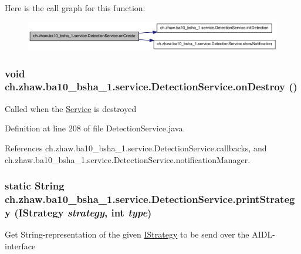 Here is the call graph for this function:\nopagebreak
\begin{figure}[H]
\begin{center}
\leavevmode
\includegraphics[width=324pt]{classch_1_1zhaw_1_1ba10__bsha__1_1_1service_1_1DetectionService_a78b14ab8beb6bafa58ed1eb4c601d8a6_cgraph}
\end{center}
\end{figure}
\hypertarget{classch_1_1zhaw_1_1ba10__bsha__1_1_1service_1_1DetectionService_ad432cd1189d8ccb72ad4a32b4cd7fd0a}{
\subsubsection[{onDestroy}]{\setlength{\rightskip}{0pt plus 5cm}void ch.zhaw.ba10\_\-bsha\_\-1.service.DetectionService.onDestroy ()}}
\label{classch_1_1zhaw_1_1ba10__bsha__1_1_1service_1_1DetectionService_ad432cd1189d8ccb72ad4a32b4cd7fd0a}
Called when the \hyperlink{}{Service} is destroyed 

Definition at line 208 of file DetectionService.java.

References ch.zhaw.ba10\_\-bsha\_\-1.service.DetectionService.callbacks, and ch.zhaw.ba10\_\-bsha\_\-1.service.DetectionService.notificationManager.\hypertarget{classch_1_1zhaw_1_1ba10__bsha__1_1_1service_1_1DetectionService_a201836f7453d62a935b7eed1203b27f6}{
\subsubsection[{printStrategy}]{\setlength{\rightskip}{0pt plus 5cm}static String ch.zhaw.ba10\_\-bsha\_\-1.service.DetectionService.printStrategy ({\bf IStrategy} {\em strategy}, \/  int {\em type})}}
\label{classch_1_1zhaw_1_1ba10__bsha__1_1_1service_1_1DetectionService_a201836f7453d62a935b7eed1203b27f6}
Get String-\/representation of the given \hyperlink{}{IStrategy} to be send over the AIDL-\/interface


